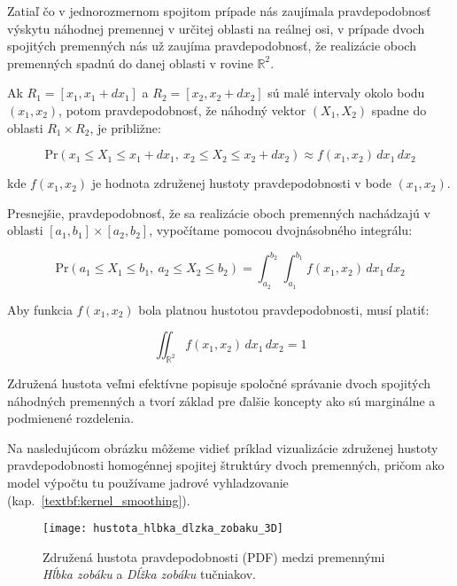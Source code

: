 Zatiaľ čo v jednorozmernom spojitom prípade nás zaujímala pravdepodobnosť výskytu náhodnej premennej v určitej oblasti na reálnej osi, v prípade dvoch spojitých premenných nás už zaujíma pravdepodobnosť, že realizácie oboch premenných spadnú do danej oblasti v rovine $\mathbb{R}^2$.

Ak $R_1 = [x_1, x_1 + dx_1]$ a $R_2 = [x_2, x_2 + dx_2]$ sú malé intervaly okolo bodu $(x_1, x_2)$, potom pravdepodobnosť, že náhodný vektor $(X_1, X_2)$ spadne do oblasti $R_1 \times R_2$, je približne:

\begin{equation}
\mathrm{Pr}(x_1 \leq X_1 \leq x_1 + dx_1,\ x_2 \leq X_2 \leq x_2 + dx_2) \approx f(x_1, x_2) \, dx_1 \, dx_2
\end{equation}

kde $f(x_1, x_2)$ je hodnota združenej hustoty pravdepodobnosti v bode $(x_1, x_2)$.

Presnejšie, pravdepodobnosť, že sa realizácie oboch premenných nachádzajú v oblasti $[a_1, b_1] \times [a_2, b_2]$, vypočítame pomocou dvojnásobného integrálu:

\begin{equation}
\mathrm{Pr}(a_1 \leq X_1 \leq b_1,\ a_2 \leq X_2 \leq b_2) = \int_{a_2}^{b_2} \int_{a_1}^{b_1} f(x_1, x_2) \, dx_1 \, dx_2
\end{equation}

Aby funkcia $f(x_1, x_2)$ bola platnou hustotou pravdepodobnosti, musí platiť:

\begin{equation}
\iint_{\mathbb{R}^2} f(x_1, x_2) \, dx_1 \, dx_2 = 1
\end{equation}

Združená hustota veľmi efektívne popisuje spoločné správanie dvoch spojitých náhodných premenných a tvorí základ pre ďalšie koncepty ako sú marginálne a podmienené rozdelenia.

Na nasledujúcom obrázku môžeme vidieť príklad vizualizácie združenej hustoty pravdepodobnosti homogénnej spojitej štruktúry dvoch premenných, pričom ako model výpočtu tu používame jadrové vyhladzovanie (kap.~\ref{textbf:kernel_smoothing}).

\begin{figure}[htpb]
    \centering
    \texttt{[image: hustota\_hlbka\_dlzka\_zobaku\_3D]}
    \caption{Združená hustota pravdepodobnosti (PDF) medzi premennými \textit{Hĺbka zobáku} a \textit{Dĺžka zobáku} tučniakov.}
    \label{fig:zobak_joint_density}
\end{figure}

